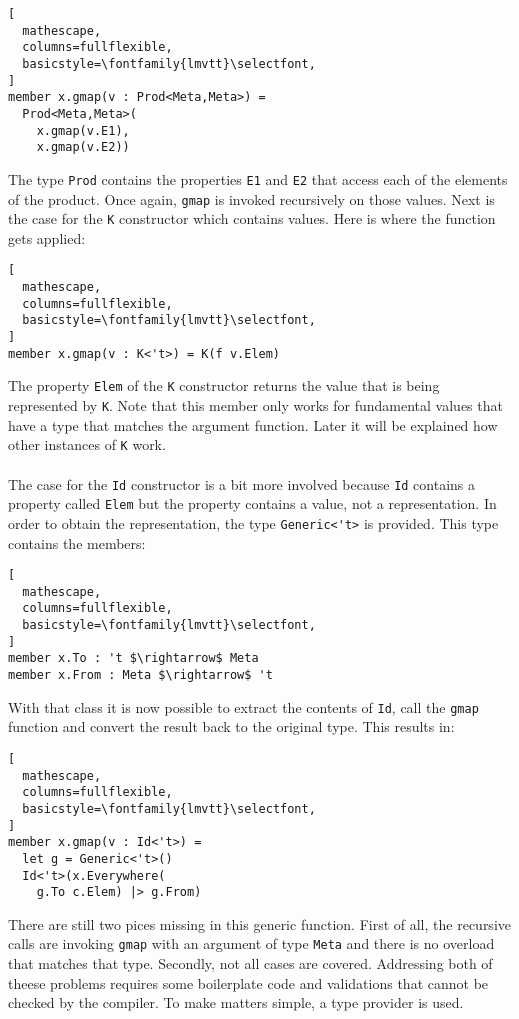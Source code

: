 \documentclass{sigplanconf}
\begin{document}
\begin{lstlisting}[
  mathescape,
  columns=fullflexible,
  basicstyle=\fontfamily{lmvtt}\selectfont,
]
member x.gmap(v : Prod<Meta,Meta>) =
  Prod<Meta,Meta>(
    x.gmap(v.E1),
    x.gmap(v.E2))
\end{lstlisting}
The type \verb+Prod+ contains the properties \verb+E1+ and \verb+E2+ that access each of the elements of the product. Once again, \verb+gmap+ is invoked recursively on those values. Next is the case for the \verb+K+ constructor which contains values. Here is where the function gets applied:
\begin{lstlisting}[
  mathescape,
  columns=fullflexible,
  basicstyle=\fontfamily{lmvtt}\selectfont,
]
member x.gmap(v : K<'t>) = K(f v.Elem)
\end{lstlisting}
The property \verb+Elem+ of the \verb+K+ constructor returns the value that is being represented by \verb+K+. Note that this member only works for fundamental values that have a type that matches the argument function. Later it will be explained how other instances of \verb+K+ work.
\\\\
The case for the \verb+Id+ constructor is a bit more involved because \verb+Id+ contains a property called \verb+Elem+ but the property contains a value, not a representation. In order to obtain the representation, the type \verb+Generic<'t>+ is provided. This type contains the members:
\begin{lstlisting}[
  mathescape,
  columns=fullflexible,
  basicstyle=\fontfamily{lmvtt}\selectfont,
]
member x.To : 't $\rightarrow$ Meta
member x.From : Meta $\rightarrow$ 't
\end{lstlisting}
With that class it is now possible to extract the contents of \verb+Id+, call the \verb+gmap+ function and convert the result back to the original type. This results in:
\begin{lstlisting}[
  mathescape,
  columns=fullflexible,
  basicstyle=\fontfamily{lmvtt}\selectfont,
]
member x.gmap(v : Id<'t>) =
  let g = Generic<'t>()
  Id<'t>(x.Everywhere(
    g.To c.Elem) |> g.From)
\end{lstlisting}
There are still two pices missing in this generic function. First of all, the recursive calls are invoking \verb+gmap+ with an argument of type \verb+Meta+ and there is no overload that matches that type. Secondly, not all cases are covered. Addressing both of theese problems requires some boilerplate code and validations that cannot be checked by the compiler. To make matters simple, a type provider is used.
\end{document}
